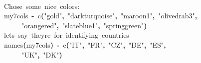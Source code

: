 \documentclass[a4paper]{article}
\newcommand{\hlfunctioncall}[1]{\textcolor[rgb]{1,0,0}{#1}}%
\newcommand{\hlstring}[1]{\textcolor[rgb]{0.6,0.6,1}{#1}}%
\newcommand{\hlkeyword}[1]{\textcolor[rgb]{0,0,0}{\textbf{#1}}}%
\newcommand{\hlcomment}[1]{\textcolor[rgb]{0.8,0.8,0.8}{#1}}%
\newcommand{\hlassignement}[1]{\textcolor[rgb]{0.215686274509804,0.215686274509804,0.384313725490196}{\textbf{#1}}}%
\newcommand{\hlsymbol}[1]{\textcolor[rgb]{0,0,0}{#1}}%
\newcommand{\hlprompt}[1]{\textcolor[rgb]{0,0,0}{#1}}%
\newcommand{\hlstd}[1]{\textcolor[rgb]{0,0,0}{#1}}%
\newenvironment{Houtput}{\raggedright}{%
%
}
\begin{document}
\begin{Houtput}
\hspace*{\fill}\\
\hlstd{}\ttfamily\noindent
\hlprompt{\usebox{\hlnormalsizeboxgreaterthan}{\ }}\hlcomment{\usebox{\hlnormalsizeboxhash}{\ }Chose{\ }some{\ }nice{\ }colors:}\mbox{}
\normalfont
\hspace*{\fill}\\
\hlstd{}\ttfamily\noindent
\hlprompt{\usebox{\hlnormalsizeboxgreaterthan}{\ }}\hlsymbol{my7cols}{\ }\hlassignement{\usebox{\hlnormalsizeboxlessthan}-}{\ }\hlfunctioncall{c}\hlkeyword{(}\hlstring{"gold"}\hlkeyword{,}{\ }\hlstring{"darkturquoise"}\hlkeyword{,}{\ }\hlstring{"maroon1"}\hlkeyword{,}{\ }\hlstring{"olivedrab3"}\hlkeyword{,}\hspace*{\fill}\\
\hlstd{}\hlprompt{{\ }}{\ }{\ }{\ }{\ }\hlstring{"orangered"}\hlkeyword{,}{\ }\hlstring{"slateblue1"}\hlkeyword{,}{\ }\hlstring{"springgreen"}\hlkeyword{)}\mbox{}
\normalfont
\hspace*{\fill}\\
\hlstd{}\ttfamily\noindent
\hlprompt{\usebox{\hlnormalsizeboxgreaterthan}{\ }}\hlcomment{\usebox{\hlnormalsizeboxhash}{\ }let\usebox{\hlnormalsizeboxsinglequote}s{\ }say{\ }they\usebox{\hlnormalsizeboxsinglequote}re{\ }for{\ }identifying{\ }countries}\mbox{}
\normalfont
\hspace*{\fill}\\
\hlstd{}\ttfamily\noindent
\hlprompt{\usebox{\hlnormalsizeboxgreaterthan}{\ }}\hlfunctioncall{names}\hlkeyword{(}\hlsymbol{my7cols}\hlkeyword{)}{\ }\hlassignement{\usebox{\hlnormalsizeboxlessthan}-}{\ }\hlfunctioncall{c}\hlkeyword{(}\hlstring{"IT"}\hlkeyword{,}{\ }\hlstring{"FR"}\hlkeyword{,}{\ }\hlstring{"CZ"}\hlkeyword{,}{\ }\hlstring{"DE"}\hlkeyword{,}{\ }\hlstring{"ES"}\hlkeyword{,}\hspace*{\fill}\\
\hlstd{}\hlprompt{{\ }}{\ }{\ }{\ }{\ }\hlstring{"UK"}\hlkeyword{,}{\ }\hlstring{"DK"}\hlkeyword{)}\mbox{}
\normalfont
\hspace*{\fill}\\
\hlstd{}
\end{Houtput}
\end{document}
